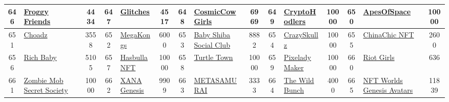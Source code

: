 \begin{table*}[]
{\begin{tabular}{|c|l|c|c|l|c|c|l|c|c|l|c|c|l|c|}
        646   & \href{https://www.froggyfriendsnft.com/}{Froggy Friends}                           & 4434              & 647   & \href{http://theglitches.art}{Glitches}                                                           & 4517              & 648   & \href{https://www.cosmic-cowgirls.io/}{CosmicCowGirls}                            & 6969              & 649   & \href{https://cryptohodlers.io/}{CryptoHodlers}                               & 10000             & 650   & \href{https://apesofspace.com}{ApesOfSpace}                                               & 10000                                   \\ \hline
        651   & \href{https://chunks.world/choadz}{Choadz}                                         & 3558              & 652   & \href{https://www.megapont.com/}{MegaKongs}                                                       & 6000              & 653   & \href{https://shibasocialclub.com}{Baby Shiba Social Club}                        & 8882              & 654   & \href{https://crazyskullz.com/}{CrazySkullz}                                  & 10000             & 655   & \href{https://chinachic.club/}{ChinaChic NFT}                                             & 2600                                    \\ \hline
        656   & \href{https://rich.baby}{Rich Baby}                                                & 5105              & 657   & \href{http://cryptohasbullanft.com/}{Hasbulla NFT}                                                & 10000             & 658   & \href{https://opensea.io/collection/turtletown}{Turtle Town}                      & 10000             & 659   & \href{https://pixeladymaker.net/}{Pixelady Maker}                             & 10000             & 660   & \href{https://riotgirls.pussyriot.love/}{Riot Girls}                                      & 636                                     \\ \hline
        661   & \href{http://www.wearezinu.com}{Zombie Mob Secret Society}                         & 10000             & 662   & \href{https://genesis.xana.net}{XANA Genesis}                                                     & 9909              & 663   & \href{https://www.metasamurai.world/}{METASAMURAI}                                & 3333              & 664   & \href{http://thewildbunch.io}{The Wild Bunch}                                 & 4000              & 665   & \href{https://nftworlds.com/avatars}{NFT Worlds Genesis Avatars}                          & 11839                                   \\ \hline

\end{tabular}}
\end{table*}

